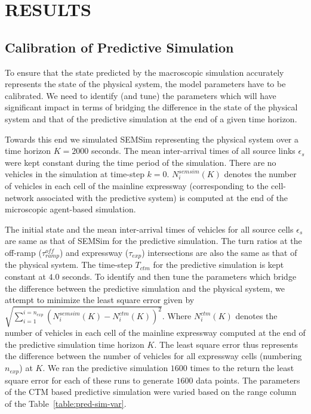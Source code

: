\documentclass{wscpaperproc}
\theoremstyle{wsc}
\begin{document}
\section{RESULTS}
\label{sec:experiments}



\subsection{Calibration of Predictive Simulation}

To ensure that the state predicted by the macroscopic simulation accurately represents the state of the physical system, the model parameters have to be calibrated. We need to identify (and tune) the parameters which will have significant impact in terms of bridging the difference in the state of the physical system and that of the predictive simulation at the end of a given time horizon.

Towards this end we simulated SEMSim representing the physical system over a time horizon $K=2000$ seconds. The mean inter-arrival times of all source links $\epsilon_s$ were kept constant during the time period of the simulation. There are no vehicles in the simulation at time-step $k=0$. $N_i^{semsim}(K)$ denotes the number of vehicles in each cell of the mainline expressway (corresponding to the cell-network associated with the predictive system) is computed at the end of the microscopic agent-based simulation. 

The initial state and the mean inter-arrival times of vehicles for all source cells $\epsilon_{s}$ are same as that of SEMSim for the predictive simulation. The turn ratios at the off-ramp ($\tau_{ramp}^{off}$) and expressway ($\tau_{exp}$) intersections are also the same as that of the physical system. The time-step $T_{ctm}$ for the predictive simulation is kept constant at $4.0$ seconds. To identify and then tune the parameters which bridge the difference between the predictive simulation and the physical system, we attempt to minimize the least square error given by $\sqrt{\sum\limits_{i=1}^{i=n_{exp}}(N_i^{semsim}(K)-N_i^{ctm}(K))^2}$.
Where $N_i^{ctm}(K)$ denotes the number of vehicles in each cell of the mainline expressway computed at the end of the predictive simulation time horizon $K$. The least square error thus represents the difference between the number of vehicles for all expressway cells (numbering $n_{exp}$) at $K$. We ran the predictive simulation $1600$ times to the return the least square error for each of these runs to generate $1600$ data points. The parameters of the CTM based predictive simulation were varied based on the range column of the Table~\ref{table:pred-sim-var}.
\end{document}
